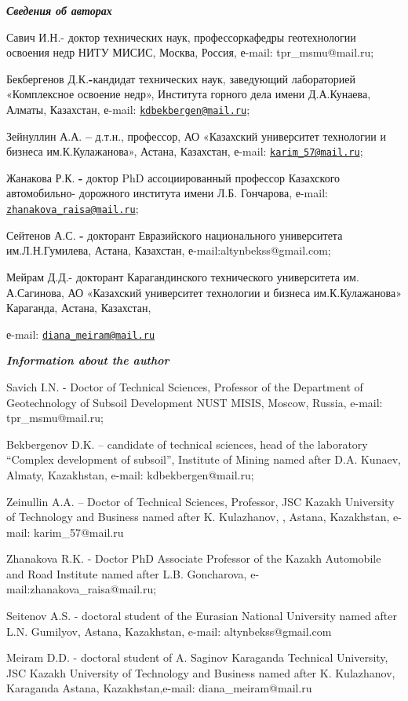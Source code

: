 \begin{authorinfo}
\hspace{1em}\emph{{\bfseries Сведения об авторах}}

Савич И.Н.- доктор технических наук, профессоркафедры геотехнологии
освоения недр НИТУ МИСИС, Москва, Россия, е-mail: tpr\_msmu@mail.ru;

Бекбергенов Д.К.{\bfseries -}кандидат технических наук, заведующий
лабораторией «Комплексное освоение недр», Института горного дела имени
Д.А.Кунаева, Алматы, Казахстан, е-mail:
\href{mailto:kdbekbergen@mail.ru}{\nolinkurl{kdbekbergen@mail.ru}};

Зейнуллин А.А. {\bfseries --} д.т.н., профессор, АО «Казахский университет
технологии и бизнеса им.К.Кулажанова», Астана, \linebreak Казахстан, е-mail:
\href{mailto:karim_57@mail.ru}{\nolinkurl{karim\_57@mail.ru}};

Жанакова Р.К. {\bfseries -} доктор PhD ассоциированный профессор Казахского
автомобильно- дорожного института имени \linebreak Л.Б. Гончарова, е-mail:
\href{mailto:zhanakova_raisa@mail.ru}{\nolinkurl{zhanakova\_raisa@mail.ru}};

Сейтенов А.С. {\bfseries -} докторант Евразийского национального
университета им.Л.Н.Гумилева, Астана, Казахстан, \linebreak е-mail:altynbekss@gmail.com;

Мейрам Д.Д.- докторант Карагандинского технического университета им.
А.Сагинова, АО «Казахский университет технологии и бизнеса
им.К.Кулажанова» Караганда, Астана, Казахстан,

е-mail:
\href{mailto:diana_meiram@mail.ru}{\nolinkurl{diana\_meiram@mail.ru}}

\hspace{1em}\emph{{\bfseries Information about the author}}

Savich I.N. - Doctor of Technical Sciences, Professor of the Department
of Geotechnology of Subsoil Development NUST MISIS, Moscow, Russia,
e-mail: tpr\_msmu@mail.ru;

Bekbergenov D.K. -- candidate of technical sciences, head of the
laboratory ``Complex development of subsoil'', Institute of Mining named
after D.A. Kunaev, Almaty, Kazakhstan, e-mail: kdbekbergen@mail.ru;

Zeinullin A.A. -- Doctor of Technical Sciences, Professor, JSC Kazakh
University of Technology and Business named after \linebreak K. Kulazhanov, ,
Astana, Kazakhstan, e-mail: karim\_57@mail.ru

Zhanakova R.K. - Doctor PhD Associate Professor of the Kazakh Automobile
and Road Institute named after L.B. Goncharova, e-mail:zhanakova\_raisa@mail.ru;

Seitenov A.S. - doctoral student of the Eurasian National University
named after L.N. Gumilyov, Astana, Kazakhstan, e-mail: altynbekss@gmail.com

Meiram D.D. - doctoral student of A. Saginov Karaganda Technical
University, JSC Kazakh University of Technology and Business named after
K. Kulazhanov, Karaganda Astana, Kazakhstan,e-mail:
diana\_meiram@mail.ru
\end{authorinfo}
